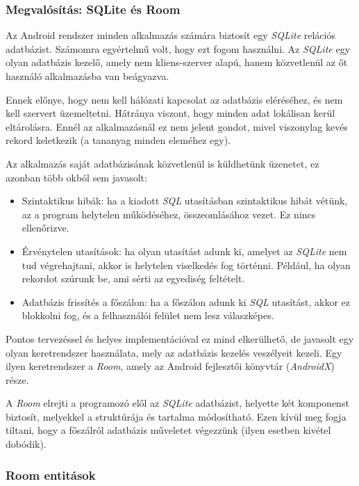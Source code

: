 \documentclass[12pt,a4paper]{article}
\begin{document}
	\subsubsection{Megvalósítás: SQLite és Room}\label{sqlite_roon}

	Az Android rendszer minden alkalmazás számára biztosít egy \textit{SQLite} relációs adatbázist. Számomra egyértelmű volt, hogy ezt fogom használni. Az \textit{SQLite} egy olyan adatbázis kezelő, amely nem kliens-szerver alapú, hanem közvetlenül az őt használó alkalmazásba van beágyazva. 
	
	Ennek előnye, hogy nem kell hálózati kapcsolat az adatbázis eléréséhez, és nem kell szervert üzemeltetni. Hátránya viszont, hogy minden adat lokálisan kerül eltárolásra. Ennél az alkalmazásnál ez nem jelent gondot, mivel viszonylag kevés rekord keletkezik (a tananyag minden eleméhez egy).
	
	Az alkalmazás saját adatbázisának közvetlenül is küldhetünk üzenetet, ez azonban több okból sem javasolt:
	
	\begin{itemize}
		\item Szintaktikus hibák: ha a kiadott \textit{SQL} utasításban szintaktikus hibát vétünk, az a program helytelen működéséhez, összeomlásához vezet. Ez nincs ellenőrizve.
		\item Érvénytelen utasítások: ha olyan utasítást adunk ki, amelyet az \textit{SQLite} nem tud végrehajtani, akkor is helytelen viselkedés fog történni. Például, ha olyan rekordot szúrunk be, ami sérti az egyediség feltételt.
		\item Adatbázis frissítés a főszálon: ha a főszálon adunk ki \textit{SQL} utasítást, akkor ez blokkolni fog, és a felhasználói felület nem lesz válaszképes. 
	\end{itemize}

	Pontos tervezéssel és helyes implementációval ez mind elkerülhető, de javasolt egy olyan keretrendszer használata, mely az adatbázis kezelés veszélyeit kezeli. Egy ilyen keretrendszer a \textit{Room}, amely az Android fejlesztői könyvtár (\textit{AndroidX}) része.
	
	A \textit{Room} elrejti a programozó elől az \textit{SQLite} adatbázist, helyette két komponenst biztosít, melyekkel a struktúrája és tartalma módosítható. Ezen kívül meg fogja tiltani, hogy a főszálról adatbázis műveletet végezzünk (ilyen esetben kivétel dobódik). 
	
	\subsubsection{Room entitások}
	
\end{document}
